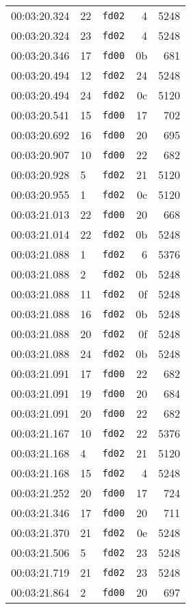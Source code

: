 \documentclass{article}
\begin{document}
\begin{longtable}{lllrr}
00:03:20.324 & 22 & \texttt{fd02} & 4 & 5248 \\
00:03:20.324 & 23 & \texttt{fd02} & 4 & 5248 \\
00:03:20.346 & 17 & \texttt{fd00} & 0b & 681 \\
00:03:20.494 & 12 & \texttt{fd02} & 24 & 5248 \\
00:03:20.494 & 24 & \texttt{fd02} & 0c & 5120 \\
00:03:20.541 & 15 & \texttt{fd00} & 17 & 702 \\
00:03:20.692 & 16 & \texttt{fd00} & 20 & 695 \\
00:03:20.907 & 10 & \texttt{fd00} & 22 & 682 \\
00:03:20.928 & 5 & \texttt{fd02} & 21 & 5120 \\
00:03:20.955 & 1 & \texttt{fd02} & 0c & 5120 \\
00:03:21.013 & 22 & \texttt{fd00} & 20 & 668 \\
00:03:21.014 & 22 & \texttt{fd02} & 0b & 5248 \\
00:03:21.088 & 1 & \texttt{fd02} & 6 & 5376 \\
00:03:21.088 & 2 & \texttt{fd02} & 0b & 5248 \\
00:03:21.088 & 11 & \texttt{fd02} & 0f & 5248 \\
00:03:21.088 & 16 & \texttt{fd02} & 0b & 5248 \\
00:03:21.088 & 20 & \texttt{fd02} & 0f & 5248 \\
00:03:21.088 & 24 & \texttt{fd02} & 0b & 5248 \\
00:03:21.091 & 17 & \texttt{fd00} & 22 & 682 \\
00:03:21.091 & 19 & \texttt{fd00} & 20 & 684 \\
00:03:21.091 & 20 & \texttt{fd00} & 22 & 682 \\
00:03:21.167 & 10 & \texttt{fd02} & 22 & 5376 \\
00:03:21.168 & 4 & \texttt{fd02} & 21 & 5120 \\
00:03:21.168 & 15 & \texttt{fd02} & 4 & 5248 \\
00:03:21.252 & 20 & \texttt{fd00} & 17 & 724 \\
00:03:21.346 & 17 & \texttt{fd00} & 20 & 711 \\
00:03:21.370 & 21 & \texttt{fd02} & 0e & 5248 \\
00:03:21.506 & 5 & \texttt{fd02} & 23 & 5248 \\
00:03:21.719 & 21 & \texttt{fd02} & 23 & 5248 \\
00:03:21.864 & 2 & \texttt{fd00} & 20 & 697 \\

\end{longtable}
\end{document}
